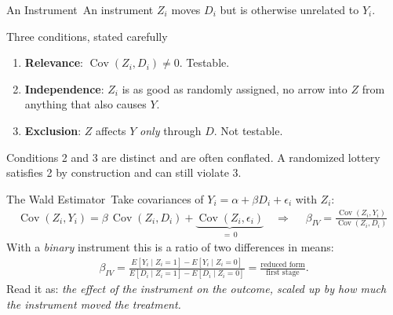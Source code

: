 \documentclass[aspectratio=169,11pt,xcolor=dvipsnames]{beamer}
\DeclareMathOperator{\Cov}{Cov}
\newcommand{\E}{E}
\newcommand{\core}{\,\raisebox{0.6pt}{\textcolor{corestar}{$\bigstar$}}}
\begin{document}
\begin{frame}[allowframebreaks,t]{An Instrument\core}
An instrument $Z_i$ moves $D_i$ but is otherwise unrelated to $Y_i$.
\vskip-2pt
\begin{center}
\end{center}
\vskip-8pt
\begin{block}{Three conditions, stated carefully}
\begin{enumerate}\itemsep1pt
  \item \textbf{Relevance}: $\Cov(Z_i, D_i) \neq 0$. \alert{Testable.}
  \item \textbf{Independence}: $Z_i$ is as good as randomly assigned, no
        arrow into $Z$ from anything that also causes $Y$.
  \item \textbf{Exclusion}: $Z$ affects $Y$ \emph{only} through $D$. \alert{Not
        testable.}
\end{enumerate}
\end{block}
\vskip2pt
Conditions 2 and 3 are distinct and are often conflated. A randomized lottery
satisfies 2 by construction and can still violate 3.
\end{frame}

\begin{frame}{The Wald Estimator\core}
Take covariances of $Y_i = \alpha + \beta D_i + \epsilon_i$ with $Z_i$:
\begin{align*}
  \Cov(Z_i, Y_i) = \beta\,\Cov(Z_i,D_i) + \underbrace{\Cov(Z_i,\epsilon_i)}_{=\,0}
  \quad\Longrightarrow\quad
  \boxed{\;\beta_{IV} = \frac{\Cov(Z_i,Y_i)}{\Cov(Z_i,D_i)}\;}
\end{align*}
\pause
With a \emph{binary} instrument this is a ratio of two differences in means:
\begin{align*}
  \beta_{IV}
  = \frac{\E[Y_i\mid Z_i=1] - \E[Y_i\mid Z_i = 0]}
         {\E[D_i\mid Z_i=1] - \E[D_i\mid Z_i = 0]}
  = \frac{\text{reduced form}}{\text{first stage}} .
\end{align*}
\vskip2pt
Read it as: \emph{the effect of the instrument on the outcome, scaled up by how
much the instrument moved the treatment.}
\end{frame}
\end{document}
